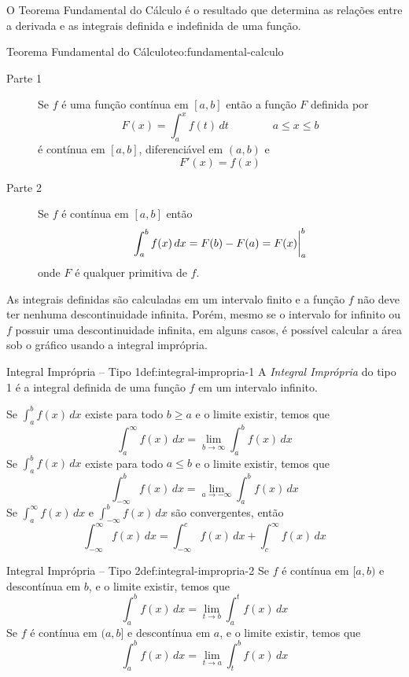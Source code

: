 O Teorema Fundamental do Cálculo é o resultado que determina as relações
entre a derivada e as integrais definida e indefinida de uma função.

\begin{teorema}{Teorema Fundamental do Cálculo}{teo:fundamental-calculo}
\begin{description}
  \item[Parte 1]
  Se $f$ é uma função contínua em $[a, b]$ então a função $F$ definida por
  \[
    F(x) = \int_a^x f(t)\, dt \qquad\qquad a \leq x \leq b
  \]
  é contínua em $[a, b]$, diferenciável em $(a, b)$ e
  \[
    F'(x) = f(x)
  \]
  \item[Parte 2]
  Se $f$ é contínua em $[a, b]$ então
  \[
   \int_a^b f(x)\,dx = F(b) - F(a) = F(x)\bigg\rvert_{a}^{b}
  \]
  onde $F$ é qualquer primitiva de $f$.
\end{description}
\end{teorema}

As integrais definidas são calculadas em um intervalo finito e a função $f$
não deve ter nenhuma descontinuidade infinita. Porém, mesmo se o intervalo for infinito
ou $f$ possuir uma descontinuidade infinita, em alguns casos, é possível
calcular a área sob o gráfico usando a integral imprópria.

\begin{definicao}{Integral Imprópria -- Tipo 1}{def:integral-impropria-1}
  A \emph{Integral Imprópria} do tipo 1
  é a integral definida de uma função $f$ em um intervalo infinito.

  Se \( \int_a^b f(x)\, dx \)
  existe para todo $b\geq a$ e o limite existir, temos que
  \[
    \int_a^\infty f(x)\,dx = \lim_{b\to\infty}\int_a^b f(x)\, dx
  \]
  Se \( \int_a^b f(x)\, dx \)
  existe para todo $a\leq b$ e o limite existir, temos que
  \[
    \int_{-\infty}^b f(x)\,dx = \lim_{a\to-\infty}\int_a^b f(x)\, dx
  \]
  Se \( \int_a^\infty    f(x)\,dx \)
  e  \( \int_{-\infty}^b f(x)\,dx \)
  são convergentes, então
  \[
    \int_{-\infty}^\infty f(x)\,dx = \int_{-\infty}^c f(x)\, dx
                                   + \int_c^\infty    f(x)\, dx
  \]
\end{definicao}

\begin{definicao}{Integral Imprópria -- Tipo 2}{def:integral-impropria-2}
  Se $f$ é contínua em $[a, b)$ e descontínua em $b$, e o limite existir,
  temos que
  \[
    \int_a^b f(x)\,dx = \lim_{t\to b} \int_a^t f(x)\,dx
  \]
  Se $f$ é contínua em $(a, b]$ e descontínua em $a$, e o limite existir,
  temos que
  \[
    \int_a^b f(x)\,dx = \lim_{t\to a} \int_t^b f(x)\,dx
  \]
\end{definicao}
